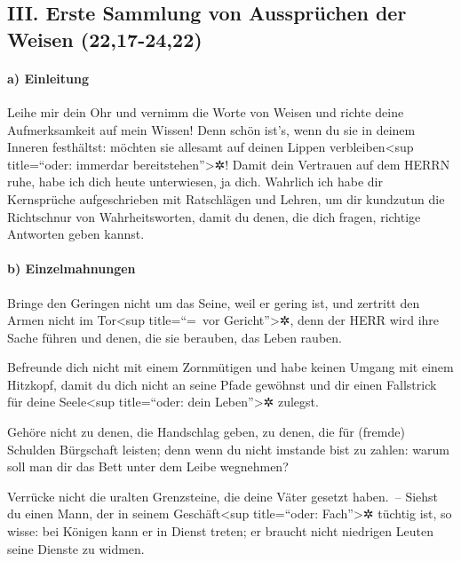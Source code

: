 \hypertarget{iii.-erste-sammlung-von-ausspruxfcchen-der-weisen-2217-2422}{%
\subsection{III. Erste Sammlung von Aussprüchen der Weisen
(22,17-24,22)}\label{iii.-erste-sammlung-von-ausspruxfcchen-der-weisen-2217-2422}}

\hypertarget{a-einleitung}{%
\paragraph{a) Einleitung}\label{a-einleitung}}

Leihe mir dein Ohr und vernimm die Worte von Weisen und
richte deine Aufmerksamkeit auf mein Wissen! Denn schön
ist's, wenn du sie in deinem Inneren festhältst: möchten sie allesamt
auf deinen Lippen verbleiben\textless sup title=``oder: immerdar
bereitstehen''\textgreater✲! Damit dein Vertrauen auf dem
HERRN ruhe, habe ich dich heute unterwiesen, ja dich.
Wahrlich ich habe dir Kernsprüche aufgeschrieben mit
Ratschlägen und Lehren, um dir kundzutun die Richtschnur
von Wahrheitsworten, damit du denen, die dich fragen, richtige Antworten
geben kannst.

\hypertarget{b-einzelmahnungen}{%
\paragraph{b) Einzelmahnungen}\label{b-einzelmahnungen}}

Bringe den Geringen nicht um das Seine, weil er gering
ist, und zertritt den Armen nicht im Tor\textless sup title=``=~vor
Gericht''\textgreater✲, denn der HERR wird ihre Sache
führen und denen, die sie berauben, das Leben rauben.

Befreunde dich nicht mit einem Zornmütigen und habe
keinen Umgang mit einem Hitzkopf, damit du dich nicht an
seine Pfade gewöhnst und dir einen Fallstrick für deine
Seele\textless sup title=``oder: dein Leben''\textgreater✲ zulegst.

Gehöre nicht zu denen, die Handschlag geben, zu denen,
die für (fremde) Schulden Bürgschaft leisten; denn wenn
du nicht imstande bist zu zahlen: warum soll man dir das Bett unter dem
Leibe wegnehmen?

Verrücke nicht die uralten Grenzsteine, die deine Väter
gesetzt haben.~-- Siehst du einen Mann, der in seinem
Geschäft\textless sup title=``oder: Fach''\textgreater✲ tüchtig ist, so
wisse: bei Königen kann er in Dienst treten; er braucht nicht niedrigen
Leuten seine Dienste zu widmen.

